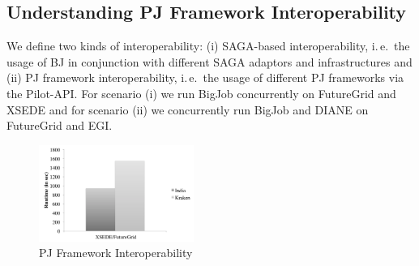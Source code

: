 \documentclass[conference,final]{IEEEtran}
\newcommand{\jhanote}[1]{ {\textcolor{red} { ***shantenu: #1 }}}
\newcommand{\alnote}[1]{ {\textcolor{blue} { ***andrel: #1 }}}
\newcommand{\alnote}[1]{}
\newcommand{\jhanote}[1]{}
\newcommand{\cu}{CU\xspace}
\newcommand{\upp}{\vspace*{-0.5em}}
\begin{document}






\subsection{Understanding PJ Framework Interoperability\upp\upp}

We define two kinds of interoperability: (i) SAGA-based
interoperability, i.\,e.\ the usage of BJ in conjunction with
different SAGA adaptors and infrastructures and (ii) PJ framework
interoperability, i.\,e.\ the usage of different PJ frameworks via the
Pilot-API. For scenario (i) we run BigJob concurrently on FutureGrid
and XSEDE and for scenario (ii) we concurrently run BigJob and DIANE
on FutureGrid and EGI.

\begin{figure}[htbp]
	\centering
	\includegraphics[width=0.45\textwidth]{perf/interop/128-bfast-interop.pdf}
	\caption{PJ Framework Interoperability}
	\label{fig:perf_interop_128-bfast-interop}
\end{figure}
\end{document}
